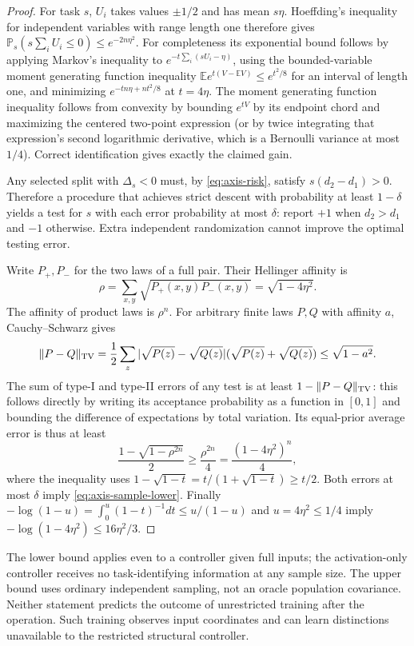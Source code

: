 \begin{proof}
For task $s$, $U_i$ takes values $\pm1/2$ and has mean $s\eta$.
Hoeffding's inequality for independent variables with range length one
therefore gives
$\mathbb P_s(s\sum_i U_i\le0)\le e^{-2n\eta^2}$.
For completeness its exponential bound follows by applying Markov's
inequality to $e^{-t\sum_i(sU_i-\eta)}$, using the bounded-variable
moment generating function inequality
$\mathbb Ee^{t(V-\mathbb EV)}\le e^{t^2/8}$ for an interval of length
one, and minimizing $e^{-tn\eta+nt^2/8}$ at $t=4\eta$.
The moment generating function inequality follows from convexity by
bounding $e^{tV}$ by its endpoint chord and maximizing the centered
two-point expression (or by twice integrating that expression's
second logarithmic derivative, which is a Bernoulli variance at most
$1/4$). Correct identification gives exactly the claimed gain.

Any selected split with $\Delta_s<0$ must, by \eqref{eq:axis-risk},
satisfy $s(d_2-d_1)>0$. Therefore a procedure that achieves strict
descent with probability at least $1-\delta$ yields a test for $s$
with each error probability at most $\delta$: report $+1$ when
$d_2>d_1$ and $-1$ otherwise. Extra independent randomization cannot
improve the optimal testing error.

Write $P_+,P_-$ for the two laws of a full pair. Their Hellinger
affinity is
\[
 \rho=\sum_{x,y}\sqrt{P_+(x,y)P_-(x,y)}
     =\sqrt{1-4\eta^2}.
\]
The affinity of product laws is $\rho^n$. For arbitrary finite laws
$P,Q$ with affinity $a$, Cauchy--Schwarz gives
\[
 \|P-Q\|_{\rm TV}
 =\frac12\sum_z|\sqrt{P(z)}-\sqrt{Q(z)}|
                 (\sqrt{P(z)}+\sqrt{Q(z)})
 \le\sqrt{1-a^2}.
\]
The sum of type-I and type-II errors of any test is at least
$1-\|P-Q\|_{\rm TV}$: this follows directly by writing its acceptance
probability as a function in $[0,1]$ and bounding the difference of
expectations by total variation. Its equal-prior average error is
thus at least
\[
 \frac{1-\sqrt{1-\rho^{2n}}}{2}\ge\frac{\rho^{2n}}4
 =\frac{(1-4\eta^2)^n}4,
\]
where the inequality uses $1-\sqrt{1-t}=t/(1+\sqrt{1-t})\ge t/2$.
Both errors at most $\delta$ imply \eqref{eq:axis-sample-lower}.
Finally $-\log(1-u)=\int_0^u(1-t)^{-1}dt\le u/(1-u)$ and
$u=4\eta^2\le1/4$ imply
$-\log(1-4\eta^2)\le16\eta^2/3$.
\end{proof}

The lower bound applies even to a controller given full inputs; the
activation-only controller receives no task-identifying information at
any sample size. The upper bound uses ordinary independent sampling,
not an oracle population covariance. Neither statement predicts the
outcome of unrestricted training after the operation. Such training
observes input coordinates and can learn distinctions unavailable to
the restricted structural controller.

